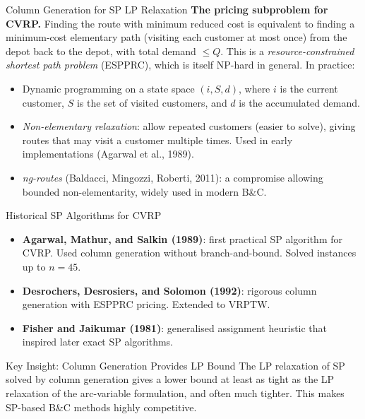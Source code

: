 \documentclass[aspectratio=169,10pt]{beamer}
\begin{document}
\begin{frame}[allowframebreaks]{Column Generation for SP LP Relaxation}
  \textbf{The pricing subproblem for CVRP.} Finding the route with minimum
  reduced cost is equivalent to finding a minimum-cost elementary path
  (visiting each customer at most once) from the depot back to the depot,
  with total demand $\leq Q$. This is a \emph{resource-constrained shortest
  path problem} (ESPPRC), which is itself NP-hard in general. In practice:
  \begin{itemize}
    \item Dynamic programming on a state space $(i, S, d)$, where $i$ is the
          current customer, $S$ is the set of visited customers, and $d$ is
          the accumulated demand.
    \item \emph{Non-elementary relaxation}: allow repeated customers
          (easier to solve), giving routes that may visit a customer multiple
          times. Used in early implementations (Agarwal et al., 1989).
    \item \emph{ng-routes} (Baldacci, Mingozzi, Roberti, 2011): a compromise
          allowing bounded non-elementarity, widely used in modern B\&C.
  \end{itemize}

  \framebreak

  \begin{block}{Historical SP Algorithms for CVRP}
    \begin{itemize}
      \item \textbf{Agarwal, Mathur, and Salkin (1989)}: first practical SP
            algorithm for CVRP. Used column generation without branch-and-bound.
            Solved instances up to $n=45$.
      \item \textbf{Desrochers, Desrosiers, and Solomon (1992)}: rigorous
            column generation with ESPPRC pricing. Extended to VRPTW.
      \item \textbf{Fisher and Jaikumar (1981)}: generalised assignment
            heuristic that inspired later exact SP algorithms.
    \end{itemize}
  \end{block}

  \begin{alertblock}{Key Insight: Column Generation Provides LP Bound}
    The LP relaxation of SP solved by column generation gives a lower bound
    at least as tight as the LP relaxation of the arc-variable formulation,
    and often much tighter. This makes SP-based B\&C methods highly
    competitive.
  \end{alertblock}
\end{frame}
\end{document}
